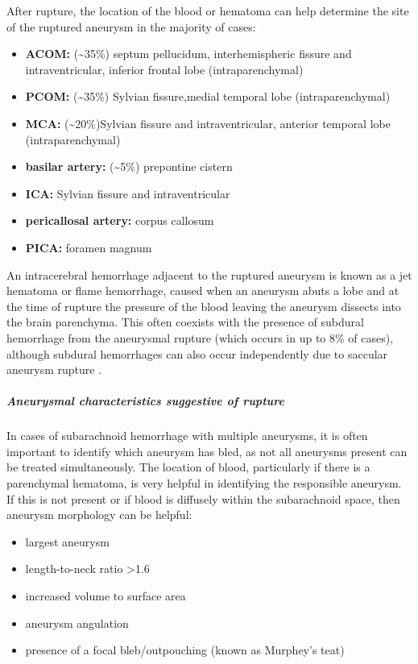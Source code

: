 After rupture, the location of the blood or hematoma can help determine the site of the ruptured aneurysm in the majority of cases:

\begin{itemize}
	\item
	\textbf{ACOM:} (\textasciitilde35\%) septum pellucidum, interhemispheric fissure and intraventricular, inferior frontal lobe (intraparenchymal)
	\item
	\textbf{PCOM:} (\textasciitilde35\%) Sylvian fissure,medial temporal lobe (intraparenchymal)
	\item
	\textbf{MCA:} (\textasciitilde20\%)Sylvian fissure and intraventricular, anterior temporal lobe (intraparenchymal)
	\item
	\textbf{basilar artery:} (\textasciitilde5\%) prepontine cistern
	\item
	\textbf{ICA:} Sylvian fissure and intraventricular
	\item
	\textbf{pericallosal artery:} corpus callosum
	\item
	\textbf{PICA:} foramen magnum
\end{itemize}

An intracerebral hemorrhage adjacent to the ruptured aneurysm is known as a jet hematoma or flame hemorrhage, caused when an aneurysm abuts a lobe and at the time of rupture the pressure of the blood leaving the aneurysm dissects into the brain parenchyma. This often coexists with the presence of subdural hemorrhage from the aneurysmal rupture (which occurs in up to 8\% of cases), although subdural hemorrhages can also occur independently due to saccular aneurysm rupture .

\subparagraph{Aneurysmal characteristics suggestive of rupture}

In cases of subarachnoid hemorrhage with multiple aneurysms, it is often important to identify which aneurysm has bled, as not all aneurysms present can be treated simultaneously. The location of blood, particularly if there is a parenchymal hematoma, is very helpful in identifying the responsible aneurysm. If this is not present or if blood is diffusely within the subarachnoid space, then aneurysm morphology can be helpful:

\begin{itemize}
	\item
	largest aneurysm
	\item
	length-to-neck ratio \textgreater1.6 
	\item
	increased volume to surface area 
	\item
	aneurysm angulation 
	\item
	presence of a focal bleb/outpouching (known as Murphey's teat) 
\end{itemize}

